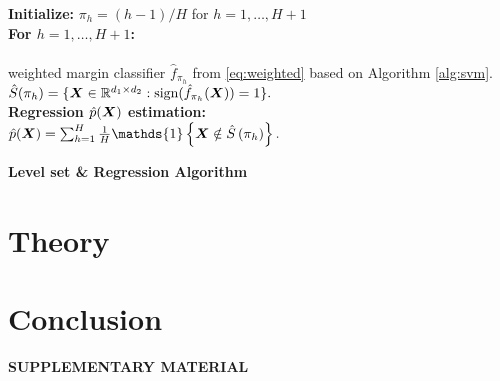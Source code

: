 \documentclass[12pt]{article}
\begin{document}
 \begin{algorithm}[h]
 \label{alg:regest}
{\bf Initialize:} $\pi_h = (h-1)/H$ for $h = 1, \ldots, H+1$\\
{\bf For $h = 1,\ldots, H+1$:}\\
\hspace*{.5cm}{\bf Level set $\hat S(\pi_h)$ estimation:}\\
\hspace*{1cm}{\bf Train} weighted margin classifier $\hat f_{\pi_h}$ from \eqref{eq:weighted} based on Algorithm \ref{alg:svm}.
\\[.1cm]
\hspace*{.9cm} $\hat S(\pi_h) = \{\bm X\in\mathbb{R}^{d_1\times d_2}:\text{sign}(\hat f_{\pi_h}(\bm X)) = 1\}.$
\\[.1cm]
{\bf Regression $\hat p(\bm X)$ estimation:} \\[.1cm]
\hspace*{.4cm} $\hat p(\mX) = \sum_{h=1}^H\frac{1}{H}\mathds{1}\left\{\mX\notin\hat S\left(\pi_h\right)\right\}.$\\[.1cm]
    \caption{{\bf Level set \& Regression Algorithm} }
\end{algorithm}



\section{Theory}
\label{sec:thm}
\section{Conclusion}
\label{sec:conc}


\bigskip
\appendix
\begin{center}
{\large\bf SUPPLEMENTARY MATERIAL}
\end{center}
\end{document}
